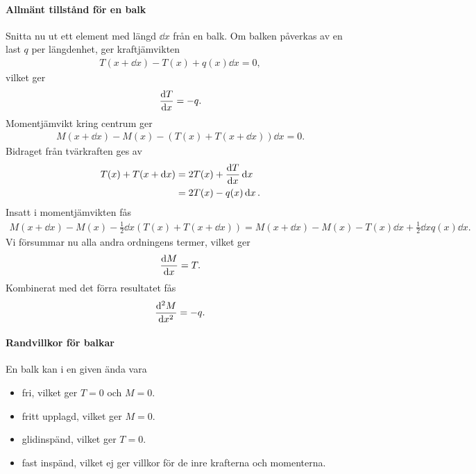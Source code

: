 \paragraph{Allmänt tillstånd för en balk}
Snitta nu ut ett element med längd $\dd{x}$ från en balk. Om balken påverkas av en last $q$ per längdenhet, ger kraftjämvikten
\begin{align*}
	T(x + \dd{x}) - T(x) + q(x)\dd{x} = 0,
\end{align*}
vilket ger
\begin{align*}
	\dv{T}{x} = -q.
\end{align*}
Momentjämvikt kring centrum ger
\begin{align*}
	M(x + \dd{x}) - M(x) - (T(x) + T(x + \dd{x}))\dd{x} = 0.
\end{align*}
Bidraget från tvärkraften ges av
\begin{align*}
	T(x) + T(x + \dd{x}) &= 2T(x) + \dv{T}{x}\dd{x} \\
	                     &= 2T(x) - q(x)\dd{x}.
\end{align*}
Insatt i momentjämvikten fås
\begin{align*}
	M(x + \dd{x}) - M(x) - \frac{1}{2}\dd{x}(T(x) + T(x + \dd{x})) = M(x + \dd{x}) - M(x) - T(x)\dd{x} + \frac{1}{2}\dd{x}q(x)\dd{x}.
\end{align*}
Vi försummar nu alla andra ordningens termer, vilket ger
\begin{align*}
	\dv{M}{x} = T.
\end{align*}
Kombinerat med det förra resultatet fås
\begin{align*}
	\dv[2]{M}{x} = -q.
\end{align*}

\paragraph{Randvillkor för balkar}
En balk kan i en given ända vara
\begin{itemize}
	\item fri, vilket ger $T = 0$ och $M = 0$.
	\item fritt upplagd, vilket ger $M = 0$.
	\item glidinspänd, vilket ger $T = 0$.
	\item fast inspänd, vilket ej ger villkor för de inre krafterna och momenterna.
\end{itemize}

